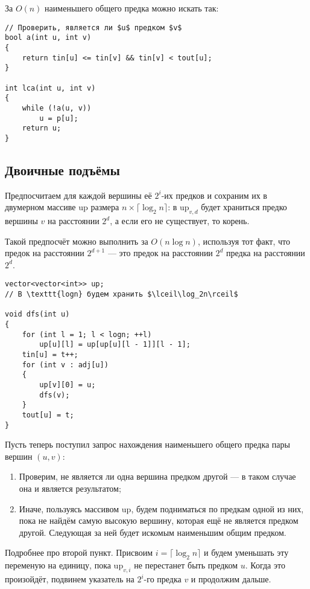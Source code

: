 За $O(n)$ наименьшего общего предка можно искать так:

\begin{verbatim}
// Проверить, является ли $u$ предком $v$
bool a(int u, int v)
{
    return tin[u] <= tin[v] && tin[v] < tout[u];
}

int lca(int u, int v)
{
    while (!a(u, v))
        u = p[u];
    return u;
}
\end{verbatim}

\subsection{Двоичные подъёмы}

Предпосчитаем для каждой вершины её $2^i$-их предков и сохраним их в двумерном массиве $\mathrm{up}$ размера $n \times \lceil\log_2 n\rceil$: в $\mathrm{up}_{v, d}$ будет храниться предко вершины $v$ на расстоянии $2^d$, а если его не существует, то корень.

Такой предпосчёт можно выполнить за $O(n\log n)$, используя тот факт, что предок на расстоянии $2^{d + 1}$ --- это предок на расстоянии $2^d$ предка на расстоянии $2^d$.

\begin{verbatim}
vector<vector<int>> up;
// В \texttt{logn} будем хранить $\lceil\log_2n\rceil$

void dfs(int u)
{
    for (int l = 1; l < logn; ++l)
        up[u][l] = up[up[u][l - 1]][l - 1];
    tin[u] = t++;
    for (int v : adj[u])
    {
        up[v][0] = u;
        dfs(v);
    }
    tout[u] = t;
}
\end{verbatim}

Пусть теперь поступил запрос нахождения наименьшего общего предка пары вершин $(u, v)$:

\begin{enumerate}[nolistsep]
    \item Проверим, не является ли одна вершина предком другой --- в таком случае она и является результатом;
    \item Иначе, пользуясь массивом $\mathrm{up}$, будем подниматься по предкам одной из них, пока не найдём самую высокую вершину, которая ещё не является предком другой. Следующая за ней будет искомым наименьшим общим предком.
\end{enumerate}

Подробнее про второй пункт. Присвоим $i = \lceil\log_2n\rceil$ и будем уменьшать эту переменую на единицу, пока $\mathrm{up}_{v, i}$ не перестанет быть предком $u$. Когда это произойдёт, подвинем указатель на $2^i$-го предка $v$ и продолжим дальше.

